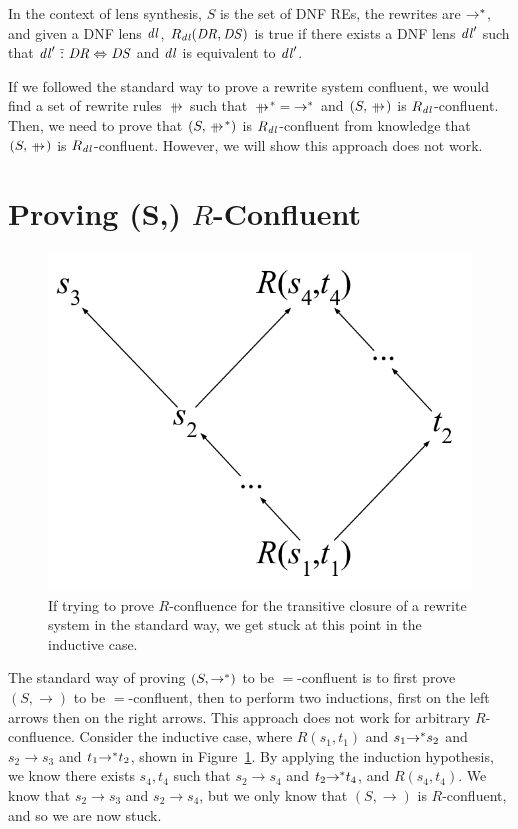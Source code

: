 \documentclass{easychair}
\begin{document}
In the context of lens synthesis, $S$ is the set of DNF REs,
the rewrites are ${\rightarrow}^*$, and given a DNF lens $\mathit{dl}$,
$R_{\mathit{dl}}(\mathit{DR},\mathit{DS})$ is true if there exists a DNF lens $\mathit{dl}'$ such
that $\mathit{dl}' \,\,\tilde{:}\,\, \mathit{DR} \Leftrightarrow \mathit{DS}$ and
$\mathit{dl}$ is equivalent to $\mathit{dl}'$.

If we followed the standard way to prove a rewrite system confluent, we would
find a set of rewrite rules $\ParallelRewrite$ such that
$\StarOf{\ParallelRewrite} = \StarOf{\Rewrite}$ and $(S,\ParallelRewrite)$ is
$R_{\mathit{dl}}$-confluent. Then, we need to prove that
$(S,\StarOf{\ParallelRewrite})$ is $R_{\mathit{dl}}$-confluent from knowledge that
$(S,\ParallelRewrite)$ is $R_{\mathit{dl}}$-confluent. However, we will show this
approach does not work.

\section{Proving (S,\StarOf{\rightarrow}) $R$-Confluent}

\begin{figure}
  \centering
    \includegraphics[scale=.4]{proof-attempt.pdf}
    \caption{If trying to prove $R$-confluence for the transitive closure of a
      rewrite system in the standard way, we get stuck at this point in the
      inductive case.}
    \label{fig:proof-attempt}
\end{figure}

The standard way of proving $(S,{\rightarrow}^*)$ to be $=$-confluent is to
first prove $(S,\rightarrow)$ to be $=$-confluent, then to perform two
inductions, first on the left arrows then on the right arrows. This approach
does not work for arbitrary $R$-confluence. Consider the inductive case, where
$R(s_1,t_1)$ and $s_1 {\rightarrow}^* s_2$ and $s_2 \rightarrow s_3$ and
$t_1 {\rightarrow}^* t_2$, shown in Figure~\ref{fig:proof-attempt}. By
applying the induction hypothesis, we know there exists $s_4, t_4$ such that $s_2
\rightarrow s_4$ and $t_2 {\rightarrow}^* t_4$, and $R(s_4,t_4)$. We know
that $s_2 \rightarrow s_3$ and $s_2 \rightarrow s_4$, but we only know that
$(S,\rightarrow)$ is $R$-confluent, and so we are now stuck.
\end{document}
